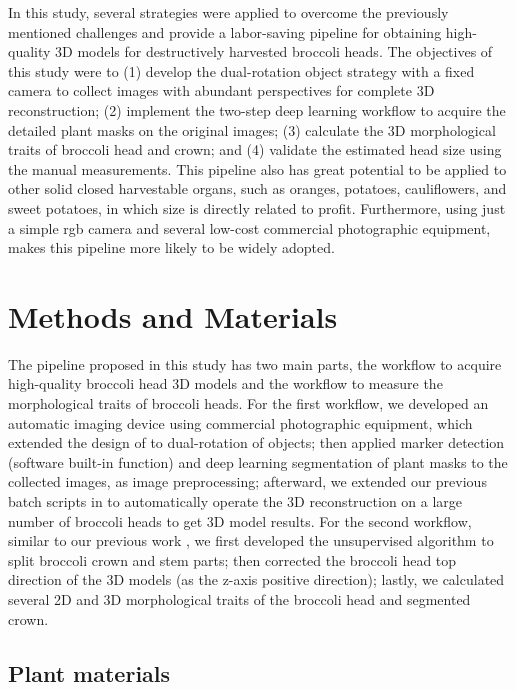 In this study, several strategies were applied to overcome the previously mentioned challenges and provide a labor-saving pipeline for obtaining high-quality 3D models for destructively harvested broccoli heads. The objectives of this study were to (1) develop the dual-rotation object strategy with a fixed camera to collect images with abundant perspectives for complete 3D reconstruction; (2) implement the two-step deep learning workflow to acquire the detailed plant masks on the original images; (3) calculate the 3D morphological traits of broccoli head and crown; and (4) validate the estimated head size using the manual measurements. This pipeline also has great potential to be applied to other solid closed harvestable organs, such as oranges, potatoes, cauliflowers, and sweet potatoes, in which size is directly related to profit. Furthermore, using just a simple \gls{rgb} camera and several low-cost commercial photographic equipment, makes this pipeline more likely to be widely adopted.


\section{Methods and Materials}

The pipeline proposed in this study has two main parts, the workflow to acquire high-quality broccoli head 3D models and the workflow to measure the morphological traits of broccoli heads. For the first workflow, we developed an automatic imaging device using commercial photographic equipment, which extended the design of \citet{kochi_3d_2018} to dual-rotation of objects; then applied marker detection (software built-in function) and deep learning segmentation of plant masks to the collected images, as image preprocessing; afterward, we extended our previous batch scripts in \citet{feldman_easydcp_2021} to automatically operate the 3D reconstruction on a large number of broccoli heads to get 3D model results. For the second workflow, similar to our previous work \citep{feldman_easydcp_2021}, we first developed the unsupervised algorithm to split broccoli crown and stem parts; then corrected the broccoli head top direction of the 3D models (as the z-axis positive direction); lastly, we calculated several 2D and 3D morphological traits of the broccoli head and segmented crown.

\subsection{Plant materials}

